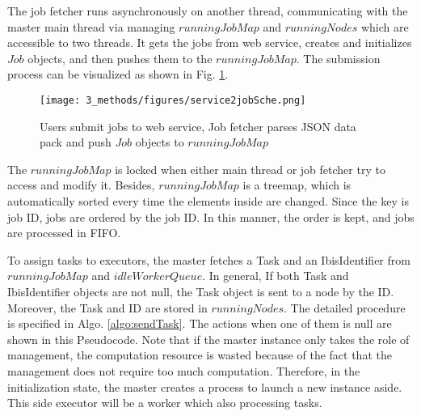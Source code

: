 The job fetcher runs asynchronously on another thread, communicating with the master main thread via managing  $runningJobMap$ and $running Nodes $ which are accessible to two threads.
It gets the jobs from web service, creates and initializes $Job$ objects, and then pushes them to the $runningJobMap$. The submission process can be visualized as shown in Fig. \ref{3_methods/figures/service2jobSche.png}.
\begin{figure}
  \centering
  \texttt{[image: 3\_methods/figures/service2jobSche.png]}
  \caption[Job fetcher forwards submitted jobs]{Users submit jobs to web service, Job fetcher parses JSON data pack and push $Job$ objects to  $runningJobMap$}
  \label{3_methods/figures/service2jobSche.png}
\end{figure}

The $runningJobMap$ is locked when either main thread or job fetcher try to access and modify it.
Besides, $runningJobMap$ is a treemap, which is automatically sorted every time the elements inside are changed. 
Since the key is job ID, jobs are ordered by the job ID. 
In this manner, the order is kept, and jobs are processed in FIFO.

To assign tasks to executors, the master fetches a Task and an IbisIdentifier from $runningJobMap$ and $idleWorkerQueue$.
In general, If both Task and IbisIdentifier objects are not null, the Task object is sent to a node by the ID. Moreover, the Task and ID are stored in $runningNodes$. 
The detailed procedure is specified in \hypertarget{Algo3}{Algo.} \ref{algo:sendTask}. The actions when one of them is null are shown in this Pseudocode.
Note that if the master instance only takes the role of management, the computation resource is wasted because of the fact that the management does not require too much computation. 
Therefore, in the initialization state, the master creates a process to launch a new instance aside. 
This side executor will be a worker which also processing tasks.

